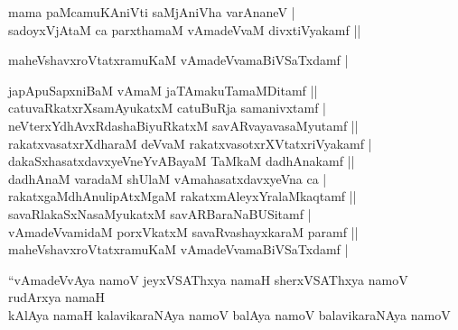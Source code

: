 \begin{entry}
\smallskip
\begin{shl}
mama paMcamuKAniVti saMjAniVha varAnaneV |\\
sadoyxVjAtaM ca parxthamaM vAmadeVvaM divxtiVyakamf ||
\end{shl}
\smallskip
{}
\smallskip
\begin{shl}
maheVshavxroVtatxramuKaM vAmadeVvamaBiVSaTxdamf |
\end{shl}
\smallskip
{}
\smallskip
{}
\smallskip
\begin{shl}
japApuSapxniBaM vAmaM jaTAmakuTamaMDitamf ||\\
catuvaRkatxrXsamAyukatxM catuBuRja samanivxtamf |\\
neVterxYdhAvxRdashaBiyuRkatxM savARvayavasaMyutamf ||\\
rakatxvasatxrXdharaM deVvaM rakatxvasotxrXVtatxriVyakamf |\\
dakaSxhasatxdavxyeVneYvABayaM TaMkaM dadhAnakamf ||\\
dadhAnaM varadaM shUlaM vAmahasatxdavxyeVna ca |\\
rakatxgaMdhAnulipAtxMgaM rakatxmAleyxYralaMkaqtamf ||\\
savaRlakaSxNasaMyukatxM savARBaraNaBUSitamf |\\
vAmadeVvamidaM porxVkatxM savaRvashayxkaraM paramf ||\\
maheVshavxroVtatxramuKaM vAmadeVvamaBiVSaTxdamf |
\end{shl}
\smallskip
{}
\smallskip
{}
\smallskip
\begin{shl}
``vAmadeVvAya namoV jeyxVSAThxya namaH sherxVSAThxya namoV rudArxya namaH\\
kAlAya namaH kalavikaraNAya namoV balAya namoV balavikaraNAya namoV\\

\end{shl}
\end{entry}
